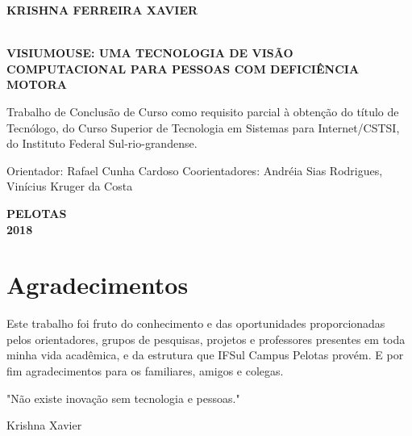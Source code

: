 \begin{titlepage}
\vfill
\begin{center}

    \begin{large} \bfseries KRISHNA FERREIRA XAVIER\end{large}\\[0.4in]
    \vspace{2cm}
    {\large\bfseries{VISIUMOUSE: UMA TECNOLOGIA DE VISÃO COMPUTACIONAL PARA PESSOAS COM DEFICIÊNCIA MOTORA}\\}
    \vspace{1cm}
    \hspace{.45\linewidth}
    \begin{minipage}{.50\linewidth}

Trabalho de Conclusão de Curso como requisito parcial  à obtenção do título de Tecnólogo, do Curso Superior de Tecnologia em Sistemas para Internet/CSTSI, do Instituto Federal Sul-rio-grandense.            

            \vspace{0.5 cm}

            Orientador: Rafael Cunha Cardoso
            Coorientadores: Andréia Sias Rodrigues, Vinícius Kruger da Costa
    
    \end{minipage}

    \vspace{2cm}
    \vfill
    \large\bfseries{PELOTAS \\ 2018}
\end{center}

\end{titlepage}

\chapter*{Agradecimentos}
\vspace*{5cm}
Este trabalho foi fruto do conhecimento e das oportunidades proporcionadas pelos orientadores, grupos de pesquisas, projetos e professores presentes em toda minha vida acadêmica, e da estrutura que IFSul Campus Pelotas provém. E por fim agradecimentos para os familiares, amigos e colegas.\\


%
\begin{flushright}
\begin{minipage}[r]{10cm}
\vspace{18cm}
"Não existe inovação sem tecnologia e pessoas."
\begin{flushright}
Krishna Xavier
\end{flushright}
\end{minipage}
\end{flushright}